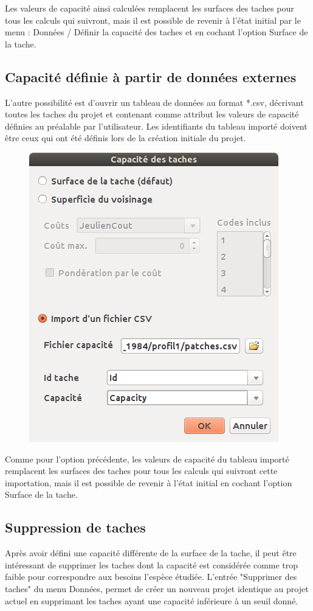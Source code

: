 \documentclass{article}
\begin{document}
Les valeurs de capacité ainsi calculées remplacent les surfaces des taches pour tous les calculs qui suivront, mais il est possible de revenir à l’état initial par le menu : Données / Définir la capacité des taches et en cochant l'option Surface de la tache.

\subsection{Capacité définie à partir de données externes}

L'autre possibilité est d'ouvrir un tableau de données au format *.csv, décrivant toutes les taches du projet et contenant comme attribut les valeurs de capacité définies au préalable par l’utilisateur. Les identifiants du tableau importé doivent être ceux qui ont été définis lors de la création initiale du projet.

\begin{figure}[H]
	\includegraphics[scale=0.5]{img/manual-fr_img9.png} 
\end{figure}

Comme pour l'option précédente, les valeurs de capacité du tableau importé remplacent les surfaces des taches pour tous les calculs qui suivront cette importation, mais il est possible de revenir à l’état initial en cochant l'option Surface de la tache.


\subsection{Suppression de taches}
Après avoir défini une capacité différente de la surface de la tache, il peut être intéressant de supprimer les taches dont la capacité est considérée comme trop faible pour correspondre aux besoins l'espèce étudiée. L'entrée "Supprimer des taches" du menu Données, permet de créer un nouveau projet identique au projet actuel en supprimant les taches ayant une capacité inférieure à un seuil donné.
\end{document}
